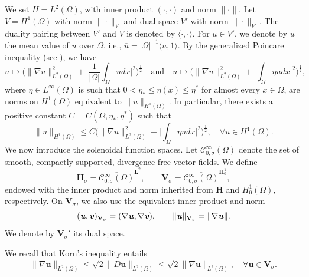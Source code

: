 \documentclass[11pt]{article}
\def\V{{\mathbf{V}}}
\def\H{\mathbf{H}}
\def\uu{\textbf{\textit{u}}}
\def\vv{\textbf{\textit{v}}}
\numberwithin{equation}{section}
\begin{document}
We set $H=L^2(\Omega)$, with inner product $(\cdot,\cdot)$ and norm $\|\cdot\|$.
Let $V=H^1(\Omega)$ with norm $\|\cdot\|_V$ and dual space $V'$ with norm $\|\cdot\|_{V'}$.
The duality pairing between $V'$ and $V$ is denoted by $\langle \cdot , \cdot \rangle$.
For $u \in V'$, we denote by $\overline{u}$ the mean value of $u$ over $\Omega$, i.e., $\overline{u}=|\Omega|^{-1}\langle u,1 \rangle$.
By the generalized Poincare inequality (see \cite[Chapter II, Section 1.4]{R}), we have
\begin{equation}
u \mapsto \Big( \|\nabla u\|_{L^2(\Omega)}^2 + \big| \frac{1}{|\Omega|} \int_\Omega u dx \big|^2 \Big)^{\frac{1}{2}} \quad \text{and} \quad u \mapsto \Big( \|\nabla u\|_{L^2(\Omega)}^2 + \big| \int_\Omega \eta u dx \big|^2 \Big)^{\frac{1}{2}}, \label{eq:3.1}
\end{equation}
where \( \eta \in L^\infty(\Omega) \) is such that \( 0 < \eta_* \leq \eta(x) \leq \eta^* \) for almost every \( x \in \Omega \), are norms on \( H^1(\Omega) \) equivalent to \( \|u\|_{H^1(\Omega)} \). In particular, there exists a positive constant \( C = C(\Omega, \eta_*, \eta^*) \) such that
\begin{equation}
\|u\|_{H^1(\Omega)} \leq C \Big( \|\nabla u\|_{L^2(\Omega)}^2 + \big| \int_\Omega \eta u dx \big|^2 \Big)^{\frac{1}{2}}, \quad \forall u \in H^1(\Omega). \label{eq:3.2}
\end{equation}
We now introduce the solenoidal function spaces.
Let $\mathcal{C}_{0,\sigma}^\infty(\Omega)$ denote the set of smooth, compactly supported, divergence-free vector fields.
We define
\[
\H_\sigma = \overline{\mathcal{C}_{0,\sigma}^\infty(\Omega)}^{\mathbf{L}^2},
\qquad
\V_\sigma = \overline{\mathcal{C}_{0,\sigma}^\infty(\Omega)}^{\mathbf{H}_0^1},
\]
endowed with the inner product and norm inherited from $\H$ and $H_0^1(\Omega)$, respectively.
On $\V_\sigma$, we also use the equivalent inner product and norm
\[
(\uu,\vv)_{\V_\sigma}=(\nabla \uu,\nabla \vv),
\qquad
\|\uu\|_{\V_\sigma}=\|\nabla \uu\|.
\]
We denote by $\V_\sigma'$ its dual space.

We recall that  Korn's inequality entails
\begin{equation}
\| \nabla \mathbf{u} \|_{L^2(\Omega)} \leq \sqrt{2} \| D \mathbf{u} \|_{L^2(\Omega)} \leq \sqrt{2} \| \nabla \mathbf{u} \|_{L^2(\Omega)}, \quad \forall \mathbf{u} \in \mathbf{V}_\sigma. \label{eq:3.8}
\end{equation}
\end{document}

